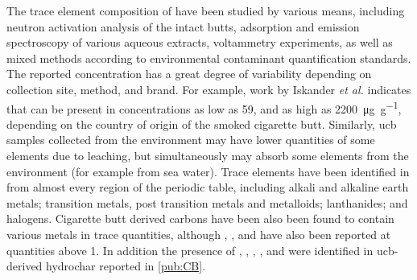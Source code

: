 The trace element composition of  have been studied by various means, including neutron activation analysis of the intact butts,\citep{iskander1992multielement, Iskander1985, jenkins1985neutron, Wu1997} \gls{adsorption} and emission spectroscopy of various aqueous extracts,\citep{MussaloRauhamaa1986, Kazi2009, Moriwaki2009, Moerman2011, Pelit2013, Dobaradaran2018} voltammetry experiments,\citep{Nitsch1991, Kalcher1993} as well as mixed methods according to environmental contaminant quantification standards.\citep{cardoso2018exposure} The reported concentration has a great degree of variability depending on collection site, method, and brand. For example, work by Iskander \textit{et al.} indicates that  can be present in concentrations as low as \num{59}, and as high as \qty{2200}{\micro\gram\per\gram}, depending on the country of origin of the smoked cigarette butt. Similarly, \acrshort{ucb} samples collected from the environment\citep{Dobaradaran2017, Moriwaki2009, Moerman2011, chevalier2018nano} may have lower quantities of some elements due to leaching, but simultaneously may absorb some elements from the environment (for example from sea water). Trace elements have been identified in  from almost every region of the periodic table, including alkali and alkaline earth metals;\cite{MussaloRauhamaa1986, Iskander1985, iskander1992multielement, jenkins1985neutron, Wu1997, cardoso2018exposure}  transition metals, post transition metals and metalloids;\citep{MussaloRauhamaa1986, Dobaradaran2017, Iskander1985, jenkins1985neutron, Wu1997, Moriwaki2009, Moerman2011, Pelit2013, Dobaradaran2018, Ren2017, cardoso2018exposure, chevalier2018nano} lanthanides;\citep{iskander1992multielement} and halogens.\citep{Iskander1985, iskander1992multielement, jenkins1985neutron, Wu1997} Cigarette butt derived carbons have been also been found to contain various metals in trace quantities,\citep{Soltani, Soltani2013, Yazdi2012} although , , and  have also been reported at quantities above \qty{1}{\wtpercent}.\citep{Soltani, Soltani2013, Yazdi2012, lima2018, Lee2014} In addition the presence of , , , , and  were identified in \acrshort{ucb}-derived \gls{hydrochar} reported in \ref{pub:CB}.

